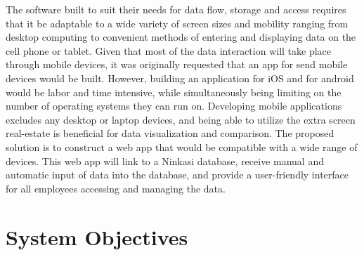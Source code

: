 \documentclass[draftclsnofoot,onecolumn,letterpaper,10pt]{IEEEtran}
\begin{document}
The software built to suit their needs for data flow, storage and access requires that it be adaptable to a wide variety of screen sizes and mobility ranging from desktop computing to convenient methods of entering and displaying data on the cell phone or tablet. Given that most of the data interaction will take place through mobile devices, it was originally requested that an app for send mobile devices would be built. However, building an application for iOS and for android would be labor and time intensive, while simultaneously being limiting on the number of operating systems they can run on. Developing mobile applications excludes any desktop or laptop devices, and being able to utilize the extra screen real-estate is beneficial for data visualization and comparison. The proposed solution is to construct a web app that would be compatible with a wide range of devices. This web app will link to a Ninkasi database, receive manual and automatic input of data into the database, and provide a user-friendly interface for all employees accessing and managing the data.



\section{\textbf{System Objectives}}
\end{document}
